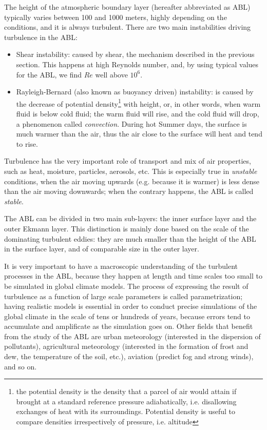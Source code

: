 \documentclass[a4paper]{book}
\begin{document}
The height of the atmospheric boundary layer (hereafter abbreviated as ABL) typically varies between 100 and 1000 meters, highly depending on the conditions, and it is always turbulent. There are two main instabilities driving turbulence in the ABL:

\begin{itemize}
\item Shear instability: caused by shear, the mechanism described in the previous section. This happens at high Reynolds number, and, by using typical values for the ABL, we find $Re$ well above $10^6$.
\item Rayleigh-Bernard (also known as buoyancy driven) instability: is caused by the decrease of potential density\footnote{the potential density is the density that a parcel of air would attain if brought at a standard reference pressure adiabatically, i.e. disallowing exchanges of heat with its surroundings. Potential density is useful to compare densities irrespectively of pressure, i.e. altitude} with height, or, in other words, when warm fluid is below cold fluid; the warm fluid will rise, and the cold fluid will drop, a phenomenon called \emph{convection}. During hot Summer days, the surface is much warmer than the air, thus the air close to the surface will heat and tend to rise.
\end{itemize}

Turbulence has the very important role of transport and mix of air properties, such as heat, moisture, particles, aerosols, etc. This is especially true in \emph{unstable} conditions, when the air moving upwards (e.g. because it is warmer) is less dense than the air moving downwards; when the contrary happens, the ABL is called \emph{stable}.

The ABL can be divided in two main sub-layers: the inner surface layer and the outer Ekmann layer. This distinction is mainly done based on the scale of the dominating turbulent eddies: they are much smaller than the height of the ABL in the surface layer, and of comparable size in the outer layer.

It is very important to have a macroscopic understanding of the turbulent processes in the ABL, because they happen at length and time scales too small to be simulated in global climate models. The process of expressing the result of turbulence as a function of large scale parameters is called parametrization; having realistic models is essential in order to conduct precise simulations of the global climate in the scale of tens or hundreds of years, because errors tend to accumulate and amplificate as the simulation goes on. Other fields that benefit from the study of the ABL are urban meteorology (interested in the dispersion of pollutants), agricultural meteorology (interested in the formation of frost and dew, the temperature of the soil, etc.), aviation (predict fog and strong winds), and so on.
\end{document}
